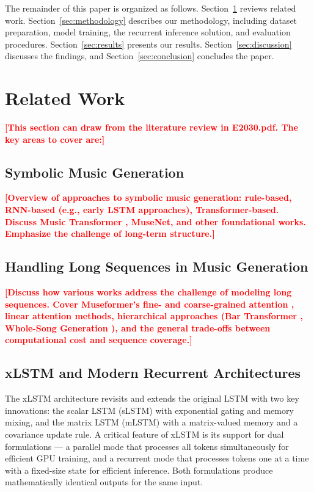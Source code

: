 \documentclass[conference]{IEEEtran}
\newcommand{\placeholder}[1]{\textcolor{red}{\textbf{[#1]}}}
\begin{document}
The remainder of this paper is organized as follows. Section~\ref{sec:related} reviews related work. Section~\ref{sec:methodology} describes our methodology, including dataset preparation, model training, the recurrent inference solution, and evaluation procedures. Section~\ref{sec:results} presents our results. Section~\ref{sec:discussion} discusses the findings, and Section~\ref{sec:conclusion} concludes the paper.

\section{Related Work}
\label{sec:related}

\placeholder{This section can draw from the literature review in E2030.pdf. The key areas to cover are:}

\subsection{Symbolic Music Generation}
\placeholder{Overview of approaches to symbolic music generation: rule-based, RNN-based (e.g., early LSTM approaches), Transformer-based. Discuss Music Transformer \cite{huang2018music}, MuseNet, and other foundational works. Emphasize the challenge of long-term structure.}

\subsection{Handling Long Sequences in Music Generation}
\placeholder{Discuss how various works address the challenge of modeling long sequences. Cover Museformer's fine- and coarse-grained attention \cite{yu2022museformer}, linear attention methods, hierarchical approaches (Bar Transformer \cite{qin2023bar}, Whole-Song Generation \cite{wang2024wholesong}), and the general trade-offs between computational cost and sequence coverage.}

\subsection{xLSTM and Modern Recurrent Architectures}
The xLSTM architecture \cite{beck2024xlstm} revisits and extends the original LSTM with two key innovations: the scalar LSTM (sLSTM) with exponential gating and memory mixing, and the matrix LSTM (mLSTM) with a matrix-valued memory and a covariance update rule. A critical feature of xLSTM is its support for dual formulations --- a parallel mode that processes all tokens simultaneously for efficient GPU training, and a recurrent mode that processes tokens one at a time with a fixed-size state for efficient inference. Both formulations produce mathematically identical outputs for the same input.
\end{document}
